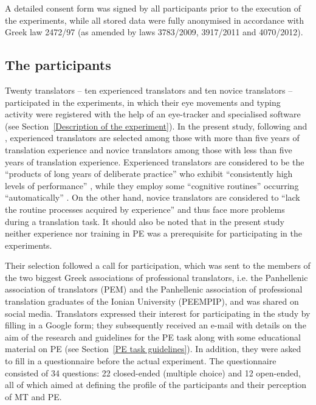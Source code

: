 \documentclass[output=paper]{langscibook}
\begin{document}
A detailed consent form was signed by all participants prior to the execution of the experiments, while all stored data were fully anonymised in accordance with Greek law 2472/97 (as amended by laws 3783/2009, 3917/2011 and 4070/2012).

\subsection{The participants}
Twenty translators -- ten experienced translators and ten novice translators -- participated in the experiments, in which their eye movements and typing activity were registered with the help of an eye-tracker and specialised software (see Section~\ref{Description of the experiment}). In the present study, following \citet{WhyattKosciuczuk2013} and \citet{ColinaAngelelli2015}, experienced translators are selected among those with more than five years of translation experience and novice translators among those with less than five years of translation experience. Experienced translators are considered to be the “products of long years of deliberate practice” who exhibit “consistently high levels of performance” \citep[151]{Shreve2002}, while they employ some “cognitive routines” occurring “automatically” \citep[137]{Kaiser-Cooke1994}. On the other hand, novice translators are considered to “lack the routine processes acquired by experience” \citep[130]{Palumbo2009} and thus face more problems during a translation task. It should also be noted that in the present study neither experience nor training in PE was a prerequisite for participating in the experiments. 

Their selection followed a call for participation, which was sent to the members of the two biggest Greek associations of professional translators, i.e. the Panhellenic association of translators (PEM) and the Panhellenic association of professional translation graduates of the Ionian University (PEEMPIP), and was shared on social media. Translators expressed their interest for participating in the study by filling in a Google form; they subsequently received an e-mail with details on the aim of the research and guidelines for the PE task along with some educational material on PE (see Section~\ref{PE task guidelines}). In addition, they were asked to fill in a questionnaire before the actual experiment. The questionnaire consisted of 34 questions: 22 closed-ended (multiple choice) and 12 open-ended, all of which aimed at defining the profile of the participants and their perception of MT and PE.
\end{document}
